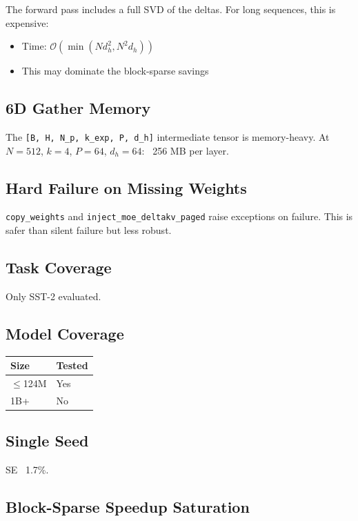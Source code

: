 The forward pass includes a full SVD of the deltas. For long sequences, 
this is expensive:
\begin{itemize}
\item Time: $\mathcal{O}(\min(N d_h^2, N^2 d_h))$
\item This may dominate the block-sparse savings

\end{itemize}
\subsection{6D Gather Memory}

The \texttt{[B, H, N\_p, k\_exp, P, d\_h]} intermediate tensor is memory-heavy. At 
$N = 512$, $k = 4$, $P = 64$, $d_h = 64$: ~256 MB per layer.

\subsection{Hard Failure on Missing Weights}

\texttt{copy\_weights} and \texttt{inject\_moe\_deltakv\_paged} raise exceptions on failure. 
This is safer than silent failure but less robust.

\subsection{Task Coverage}

Only SST-2 evaluated.

\subsection{Model Coverage}

\begin{table}[H]
\centering
\small
\begin{tabular}{ll}
\toprule
\textbf{Size} & \textbf{Tested} \\
\midrule
$\le$124M & Yes \\
1B+ & No \\
\bottomrule
\end{tabular}
\end{table}

\subsection{Single Seed}

SE ~1.7\%.

\subsection{Block-Sparse Speedup Saturation}

